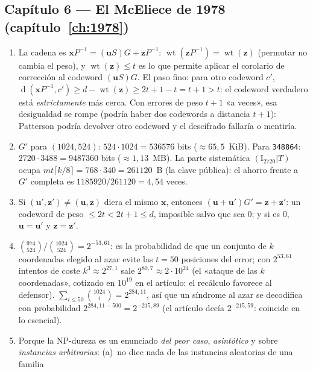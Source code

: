 \documentclass[11pt,a4paper,oneside]{report}
\newcommand{\wt}{\operatorname{wt}}
\newcommand{\dist}{\operatorname{d}}
\newcommand{\vx}{\mathbf{x}}
\newcommand{\vu}{\mathbf{u}}
\newcommand{\vz}{\mathbf{z}}
\begin{document}
\subsection*{Capítulo 6 --- El McEliece de 1978
(capítulo~\ref{ch:1978})}

\begin{enumerate}[leftmargin=1.9em,itemsep=4pt]
  \item La cadena es
        $\vx P^{-1}=(\vu S)G+\vz P^{-1}$: $\wt(\vz P^{-1})=\wt(\vz)$
        (permutar no cambia el peso), y $\wt(\vz)\le t$ es lo que
        permite aplicar el corolario de corrección al codeword
        $(\vu S)G$. El paso fino: para otro codeword $c'$,
        $\dist(\vx P^{-1},c')\ge d-\wt(\vz)\ge 2t+1-t=t+1>t$:
        el codeword verdadero está \emph{estrictamente} más cerca.
        Con errores de peso $t+1$ «a veces», esa desigualdad se
        rompe (podría haber dos codewords a distancia $t+1$):
        Patterson podría devolver otro codeword y el descifrado
        fallaría o mentiría.
  \item $G'$ para $(1024,524)$: $524\cdot1024=\num{536576}$ bits
        ($\approx65{,}5$~KiB). Para \texttt{348864}:
        $2720\cdot3488=\num{9487360}$ bits
        ($\approx1{,}13$~MB). La parte sistemática
        $(\mathrm{I}_{2720}|T)$ ocupa $mt\lceil k/8\rceil
        =768\cdot340=\num{261120}$~B (la clave pública): el ahorro
        frente a $G'$ completa es $1185920/261120=4{,}54$ veces.
  \item Si $(\vu',\vz')\ne(\vu,\vz)$ diera el mismo $\vx$, entonces
        $(\vu+\vu')G'=\vz+\vz'$: un codeword de peso
        $\le2t<2t+1\le d$, imposible salvo que sea $0$; y si es
        $0$, $\vu=\vu'$ y $\vz=\vz'$.
  \item $\binom{974}{524}/\binom{1024}{524}=2^{-53{,}61}$: es la
        probabilidad de que un conjunto de $k$ coordenadas elegido al
        azar evite las $t=50$ posiciones del error; con
        $2^{53{,}61}$ intentos de coste $k^3\approx2^{27{,}1}$ sale
        $2^{80{,}7}\approx2\cdot10^{24}$ (el «ataque de las $k$
        coordenadas», cotizado en $10^{19}$ en el artículo: el
        recálculo favorece al defensor). $\sum_{i\le50}\binom{1024}{i}
        =2^{284{,}11}$, así que un síndrome al azar se decodifica con
        probabilidad $2^{284{,}11-500}=2^{-215{,}89}$ (el artículo
        decía $2^{-215{,}59}$: coincide en lo esencial).
  \item Porque la NP-dureza es un enunciado \emph{del peor caso},
        \emph{asintótico} y sobre \emph{instancias arbitrarias}:
        (a)~no dice nada de las instancias aleatorias de una familia

\end{enumerate}
\end{document}
